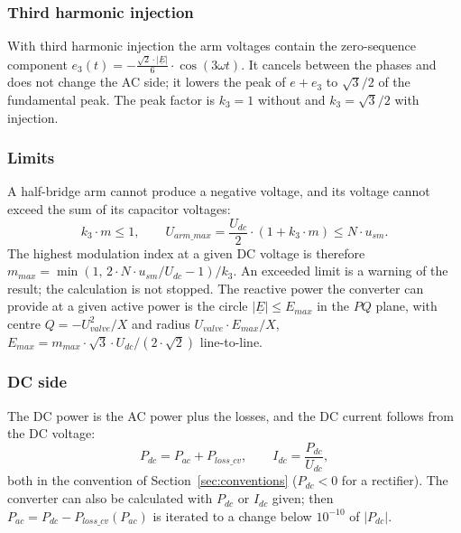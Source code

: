 \subsubsection{Third harmonic injection}

With third harmonic injection the arm voltages contain the zero-sequence component
$e_3(t) = -\tfrac{\sqrt{2} \cdot |\underline{E}|}{6} \cdot \cos(3 \omega t)$. It cancels between the phases and does
not change the AC side; it lowers the peak of $e + e_3$ to $\sqrt{3}/2$ of the fundamental peak. The peak factor is
$k_3 = 1$ without and $k_3 = \sqrt{3}/2$ with injection.

\subsubsection{Limits}

A half-bridge arm cannot produce a negative voltage, and its voltage cannot exceed the sum of its capacitor
voltages:
\begin{equation}
  k_3 \cdot m \le 1 , \qquad
  U_{arm\_max} = \frac{U_{dc}}{2} \cdot \left( 1 + k_3 \cdot m \right) \le N \cdot u_{sm} .
\end{equation}
The highest modulation index at a given DC voltage is therefore
$m_{max} = \min\left( 1, \, 2 \cdot N \cdot u_{sm} / U_{dc} - 1 \right) / k_3$. An exceeded limit is a warning of
the result; the calculation is not stopped. The reactive power the converter can provide at a given active power is
the circle $|\underline{E}| \le E_{max}$ in the $PQ$ plane, with centre $Q = -U_{valve}^2 / X$ and radius
$U_{valve} \cdot E_{max} / X$, $E_{max} = m_{max} \cdot \sqrt{3} \cdot U_{dc} / (2 \cdot \sqrt{2})$ line-to-line.

\subsubsection{DC side}

The DC power is the AC power plus the losses, and the DC current follows from the DC voltage:
\begin{equation}
  P_{dc} = P_{ac} + P_{loss\_cv} , \qquad I_{dc} = \frac{P_{dc}}{U_{dc}} ,
\end{equation}
both in the convention of Section~\ref{sec:conventions} ($P_{dc} < 0$ for a rectifier). The converter can also be
calculated with $P_{dc}$ or $I_{dc}$ given; then $P_{ac} = P_{dc} - P_{loss\_cv}(P_{ac})$ is iterated to a change
below $10^{-10}$ of $|P_{dc}|$.
